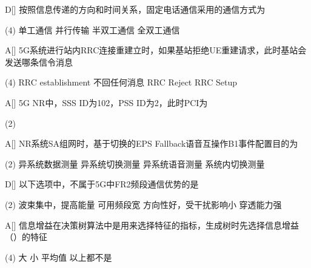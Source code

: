 \begin{choice}{D}[]
    按照信息传递的方向和时间关系，固定电话通信采用的通信方式为
    \begin{tasks}(4)
        \task 单工通信
        \task 并行传输
        \task 半双工通信
        \task 全双工通信
    \end{tasks}
\end{choice}

\begin{choice}{A}[]
    5G系统进行站内RRC连接重建立时，如果基站拒绝UE重建请求，此时基站会发送哪条信令消息
    \begin{tasks}(4)
        \task RRC establishment
        \task 不回任何消息
        \task RRC Reject
        \task RRC Setup
    \end{tasks}
\end{choice}


\begin{choice}{A}[]
    5G NR中，SSS ID为102，PSS ID为2，此时PCI为
    \begin{tasks}(2)
    \end{tasks}
\end{choice}



\begin{choice}{A}[]
    NR系统SA组网时，基于切换的EPS Fallback语音互操作B1事件配置目的为
    \begin{tasks}(2)
        \task 异系统数据测量
        \task 异系统切换测量
        \task 异系统语音测量
        \task 系统内切换测量
    \end{tasks}
\end{choice}



\begin{choice}{D}[]
    以下选项中，不属于5G中FR2频段通信优势的是
    \begin{tasks}(2)
        \task 波束集中，提高能量
        \task 可用频段宽
        \task 方向性好，受干扰影响小
        \task 穿透能力强
    \end{tasks}
\end{choice}




\begin{choice}{A}[]
    信息增益在决策树算法中是用来选择特征的指标，生成树时先选择信息增益（\qquad）的特征
    \begin{tasks}(4)
        \task 大
        \task 小
        \task 平均值
        \task 以上都不是
    \end{tasks}
\end{choice}

